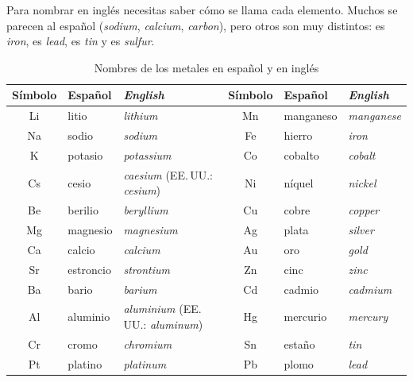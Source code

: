 \documentclass[12pt]{article}
\theoremstyle{mygreennumbox}
\newcommand{\en}[1]{\textit{#1}}
\begin{document}
Para nombrar en inglés necesitas saber cómo se llama cada elemento. Muchos se parecen al español (\en{sodium}, \en{calcium}, \en{carbon}), pero otros son muy distintos:  es \en{iron},  es \en{lead},  es \en{tin} y  es \en{sulfur}.

\begin{table}[H]
    \centering
    \caption{Nombres de los metales en español y en inglés}
    \vspace{-5pt}
    \begin{tabular}{@{}cll@{\hspace{1cm}}cll@{}}
        \toprule
        \textbf{Símbolo} & \textbf{Español} & \textbf{\en{English}} & \textbf{Símbolo} & \textbf{Español} & \textbf{\en{English}} \\
        \midrule
        Li & litio & \en{lithium} & Mn & manganeso & \en{manganese} \\[3pt]
        Na & sodio & \en{sodium} & Fe & hierro & \en{iron} \\[3pt]
        K & potasio & \en{potassium} & Co & cobalto & \en{cobalt} \\[3pt]
        Cs & cesio & \en{caesium} (EE.\,UU.: \en{cesium}) & Ni & níquel & \en{nickel} \\[3pt]
        Be & berilio & \en{beryllium} & Cu & cobre & \en{copper} \\[3pt]
        Mg & magnesio & \en{magnesium} & Ag & plata & \en{silver} \\[3pt]
        Ca & calcio & \en{calcium} & Au & oro & \en{gold} \\[3pt]
        Sr & estroncio & \en{strontium} & Zn & cinc & \en{zinc} \\[3pt]
        Ba & bario & \en{barium} & Cd & cadmio & \en{cadmium} \\[3pt]
        Al & aluminio & \en{aluminium} (EE.\,UU.: \en{aluminum}) & Hg & mercurio & \en{mercury} \\[3pt]
        Cr & cromo & \en{chromium} & Sn & estaño & \en{tin} \\[3pt]
        Pt & platino & \en{platinum} & Pb & plomo & \en{lead} \\
        \bottomrule
    \end{tabular}
    \label{tab:metales_en}
\end{table}
\end{document}
